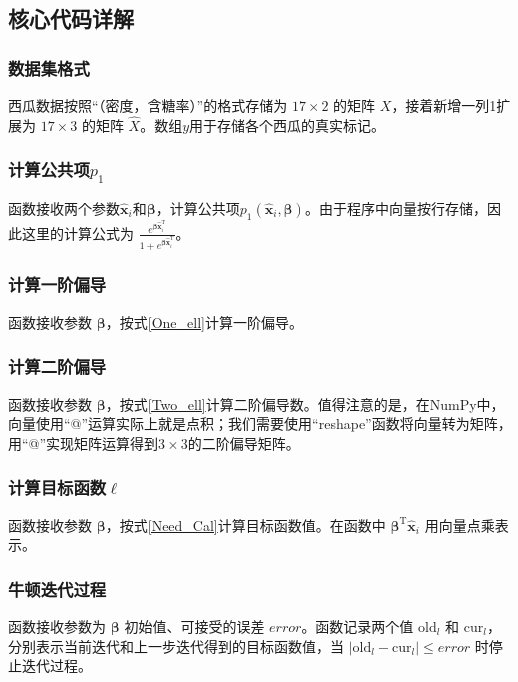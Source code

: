 \documentclass{ctexart}
\begin{document}
	\subsection{核心代码详解} 
	\subsubsection{数据集格式}
	西瓜数据按照“（密度，含糖率）”的格式存储为 $17\times 2$ 的矩阵 $X$，接着新增一列1扩展为 $17\times3$ 的矩阵 $\hat{X}$。数组$y$用于存储各个西瓜的真实标记。
	
	\subsubsection{计算公共项$p_1$}
	函数接收两个参数$\hat{\bm{x}}_i$和$\bm{\beta}$，计算公共项$p_1(\hat{\bm{x}}_i,\bm{\beta})$。由于程序中向量按行存储，因此这里的计算公式为 $\frac{e^{\bm{\beta}\hat{\bm{x}}_i^\mathrm{T}}}{1+e^{\bm{\beta}\hat{\bm{x}}_i^\mathrm{T}}}$。
	
	\subsubsection{计算一阶偏导}
	函数接收参数 $\bm{\beta}$，按式\eqref{One_ell}计算一阶偏导。
	
	\subsubsection{计算二阶偏导}
	函数接收参数 $\bm{\beta}$，按式\eqref{Two_ell}计算二阶偏导数。值得注意的是，在NumPy中，向量使用“@”运算实际上就是点积；我们需要使用“reshape”函数将向量转为矩阵，用“@”实现矩阵运算得到$3\times3$的二阶偏导矩阵。
	
	\subsubsection{计算目标函数$\ell$}
	函数接收参数 $\bm{\beta}$，按式\eqref{Need_Cal}计算目标函数值。在函数中 $\bm{\beta}^\mathrm{T}\hat{\bm{x}}_i$ 用向量点乘表示。
	
	\subsubsection{牛顿迭代过程}
	函数接收参数为 $\bm{\beta}$ 初始值、可接受的误差 $error$。函数记录两个值 $\text{old}_l$ 和 $\text{cur}_l$，分别表示当前迭代和上一步迭代得到的目标函数值，当 $|\text{old}_l-\text{cur}_l|\leqslant error$ 时停止迭代过程。
	
\end{document}
